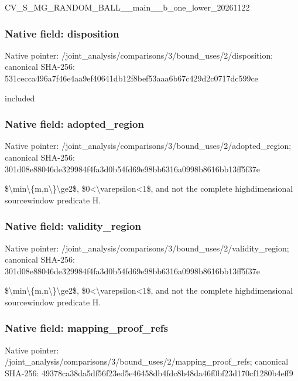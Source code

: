 \documentclass[10pt,a4paper]{article}
\begin{document}
CV\_S\_MG\_RANDOM\_BALL\_\_mai\allowbreak{}n\_\_b\_one\_lower\_20261122


\subsubsection{Native field: disposition}


Native pointer: /joint\_analysis/comparis\allowbreak{}ons/3/bound\_uses/2/dispo\allowbreak{}sition; canonical SHA-256: 531cecca496a7f46e4aa9ef4\allowbreak{}0641db12f8bef53aaa6b67c4\allowbreak{}29d2c0717dc599ce


included


\subsubsection{Native field: adopted\_region}


Native pointer: /joint\_analysis/comparis\allowbreak{}ons/3/bound\_uses/2/adopt\allowbreak{}ed\_region; canonical SHA-256: 301d08e88046de329984f4fa\allowbreak{}3d0b54fd69e98bb6316a0998\allowbreak{}b8616bb13ff5f37e


\$\textbackslash{}min\textbackslash{}\{m,n\textbackslash{}\}\textbackslash{}ge2\$, \$0<\textbackslash{}varepsilon<1\$, and not the complete highdimensional sourcewindow predicate H.


\subsubsection{Native field: validity\_region}


Native pointer: /joint\_analysis/comparis\allowbreak{}ons/3/bound\_uses/2/valid\allowbreak{}ity\_region; canonical SHA-256: 301d08e88046de329984f4fa\allowbreak{}3d0b54fd69e98bb6316a0998\allowbreak{}b8616bb13ff5f37e


\$\textbackslash{}min\textbackslash{}\{m,n\textbackslash{}\}\textbackslash{}ge2\$, \$0<\textbackslash{}varepsilon<1\$, and not the complete highdimensional sourcewindow predicate H.


\subsubsection{Native field: mapping\_proof\_refs}


Native pointer: /joint\_analysis/comparis\allowbreak{}ons/3/bound\_uses/2/mappi\allowbreak{}ng\_proof\_refs; canonical SHA-256: 49378ca38da5df56f23ed5e4\allowbreak{}6458db4fdc8b48da46f0bf23\allowbreak{}d170cf1280b4eff9
\end{document}
